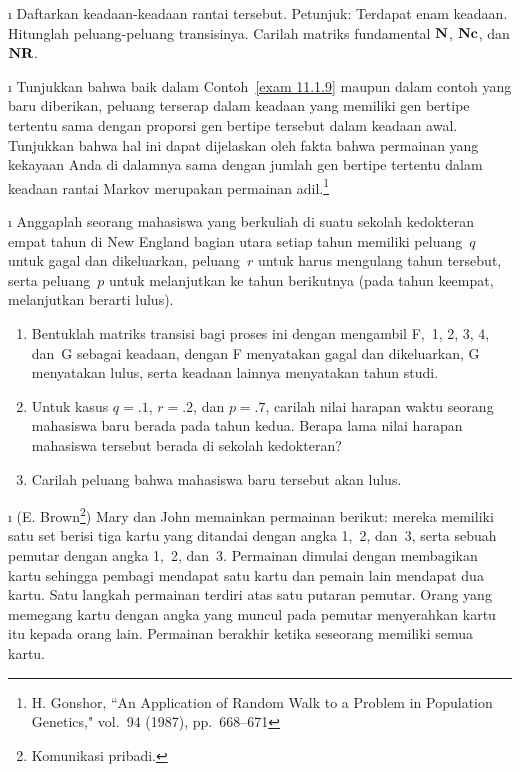 \begin{LJSItem}
\i\label{exer 11.2.15} Daftarkan keadaan-keadaan rantai tersebut. \emx
{Petunjuk}: Terdapat enam keadaan. Hitunglah peluang-peluang transisinya. Carilah
matriks fundamental ${\mbox{\bf N}\/}$, ${\mbox{\bf N}\/}{\mbox{\bf c}\/}$, dan ${\mbox{\bf N}\/}{\mbox{\bf R}\/}$.

\i\label{exer 11.2.16} Tunjukkan bahwa baik dalam Contoh~\ref{exam 11.1.9}
maupun dalam contoh yang baru diberikan, peluang terserap dalam keadaan yang
memiliki gen bertipe tertentu sama dengan proporsi gen bertipe tersebut dalam
keadaan awal. Tunjukkan bahwa hal ini dapat dijelaskan oleh fakta bahwa permainan
yang kekayaan Anda di dalamnya sama dengan jumlah gen bertipe tertentu dalam
keadaan rantai Markov merupakan permainan adil.\footnote{H. Gonshor, ``An Application of
Random Walk to a Problem in Population Genetics," 
vol.~94 (1987), pp.~668--671}

\i\label{exer 11.2.17} Anggaplah seorang mahasiswa yang berkuliah di suatu
sekolah kedokteran empat tahun di New England bagian utara setiap tahun memiliki
peluang~$q$ untuk gagal dan dikeluarkan, peluang~$r$ untuk harus mengulang tahun
tersebut, serta peluang~$p$ untuk melanjutkan ke tahun berikutnya (pada tahun
keempat, melanjutkan berarti lulus).
\begin{enumerate}
\item Bentuklah matriks transisi bagi proses ini dengan mengambil F,~1, 2, 3,
4, dan~G sebagai keadaan, dengan F menyatakan gagal dan dikeluarkan, G menyatakan
lulus, serta keadaan lainnya menyatakan tahun studi.

\item Untuk kasus $q = .1$, $r = .2$, dan $p = .7$, carilah nilai harapan waktu
seorang mahasiswa baru berada pada tahun kedua. Berapa lama nilai harapan
mahasiswa tersebut berada di sekolah kedokteran?

\item Carilah peluang bahwa mahasiswa baru tersebut akan lulus.
\end{enumerate}

\i\label{exer 11.2.18} (E. Brown\footnote{Komunikasi pribadi.}) 
Mary dan John memainkan permainan berikut: mereka memiliki satu set berisi tiga
kartu yang ditandai dengan angka 1,~2, dan~3, serta sebuah pemutar dengan angka
1,~2, dan~3. Permainan dimulai dengan membagikan kartu sehingga pembagi mendapat
satu kartu dan pemain lain mendapat dua kartu. Satu langkah permainan terdiri
atas satu putaran pemutar. Orang yang memegang kartu dengan angka yang muncul
pada pemutar menyerahkan kartu itu kepada orang lain. Permainan berakhir ketika
seseorang memiliki semua kartu.
\begin{enumerate}


\end{enumerate}
\end{LJSItem}
